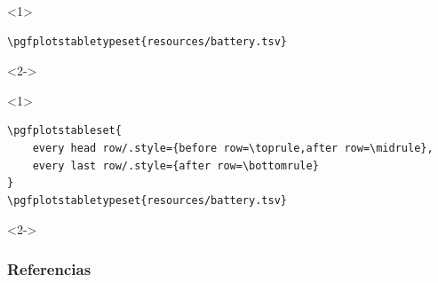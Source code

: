 \documentclass[12pt,aspectratio=169,ignorenonframetext]{ltxbeamer}
\begin{document}
\begin{frame}[fragile]
\begin{onlyenv}<1>
\begin{verbatim}
\pgfplotstabletypeset{resources/battery.tsv}
\end{verbatim}
\end{onlyenv}

\begin{onlyenv}<2->
\centering
\tiny
{}
\par
\end{onlyenv}
\end{frame}





\begin{frame}[fragile]
\begin{onlyenv}<1>
\begin{verbatim}
\pgfplotstableset{
    every head row/.style={before row=\toprule,after row=\midrule},
    every last row/.style={after row=\bottomrule}
}
\pgfplotstabletypeset{resources/battery.tsv}
\end{verbatim}
\end{onlyenv}

\begin{onlyenv}<2->
\centering
\tiny
{}
\par
\end{onlyenv}
\end{frame}





\begin{frame}[allowframebreaks]
\frametitle{Referencias}
\nocite{*}
\printbibliography
\end{frame}
\end{document}
